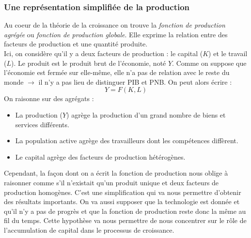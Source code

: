 \documentclass[10pt]{book}
\begin{document}
\subsubsection{Une représentation simplifiée de la production}
Au coeur de la théorie de la croissance on trouve la \textit{fonction de production agrégée} ou \textit{fonction de production globale}. Elle exprime la relation entre des facteurs de production et une quantité produite. \\
Ici, on considère qu'il y a deux facteurs de production : le capital ($K$) et le travail ($L$). Le produit est le produit brut de l'économie, noté $Y$. Comme on suppose que l'économie est fermée sur elle-même, elle n'a pas de relation avec le reste du monde $\rightarrow$ il n'y a pas lieu de distinguer PIB et PNB. On peut alors écrire :
$$ Y = F(K,L) $$
On raisonne sur des agrégats :
\begin{itemize}
  \item La production ($Y$) agrège la production d'un grand nombre de biens et services différents.
  \item La population active agrège des travailleurs dont les compétences diffèrent.
  \item Le capital agrège des facteurs de production hétérogènes.
\end{itemize}
Cependant, la façon dont on a écrit la fonction de production nous oblige à raisonner comme s'il n'existait qu'un produit unique et deux facteurs de production homogènes. C'est une simplification qui va nous permettre d'obtenir des résultats importants. On va aussi supposer que la technologie est donnée et qu'il n'y a pas de progrès et que la fonction de production reste donc la même au fil du temps. Cette hypothèse va nous permettre de nous concentrer sur le rôle de l'accumulation de capital dans le processus de croissance.
\end{document}
